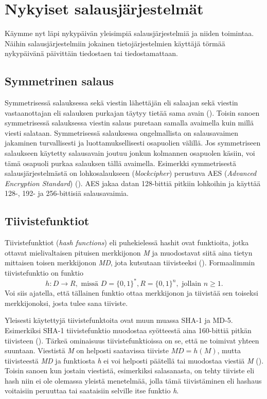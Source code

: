 \chapter{Nykyiset salausjärjestelmät\label{methods}}

Käymme nyt läpi nykypäivän yleisimpiä salausjärjestelmiä ja niiden toimintaa. Näihin salausjärjestelmiin jokainen tietojärjestelmien käyttäjä törmää nykypäivänä päivittäin tiedostaen tai tiedostamattaan.

\section{Symmetrinen salaus}
 Symmetrisessä salauksessa sekä viestin lähettäjän eli salaajan sekä viestin vastaanottajan eli salauksen purkajan täytyy tietää sama avain (\cite{bellare2005introduction}). Toisin sanoen symmetrisessä salauksessa viestin salaus puretaan samalla avaimella kuin millä viesti salataan.  Symmetrisessä salauksessa ongelmallista on salausavaimen jakaminen turvallisesti ja luottamuksellisesti osapuolien välillä. Jos symmetriseen salaukseen käytetty salausavain joutuu jonkun kolmannen osapuolen käsiin, voi tämä osapuoli purkaa salauksen tällä avaimella. Esimerkki symmetrisestä salausjärjestelmästä on lohkosalaukseen (\emph{blockcipher}) perustuva AES (\emph{Advanced Encryption Standard}) (\cite{117146}). AES jakaa datan 128-bittiä pitkiin lohkoihin ja käyttää 128-, 192- ja 256-bittisiä salausavaimia.
 
 \section{Tiivistefunktiot}
 Tiivistefunktiot (\emph{hash functions}) eli puhekielessä hashit  ovat funktioita, jotka ottavat mielivaltaisen pituisen merkkijonon \emph{M} ja muodostavat siitä aina tietyn mittaisen toisen merkkijonon \emph{MD}, jota kutsutaan tiivisteeksi (\cite{sobti2012cryptographic}). Formaalimmin tiivistefunktio on funktio
 \[h: D \to R, \text{ missä } D = \big\{0,1\big\}^{*}, R = \big\{0,1\big\}^{n}, \text{ jollain } n \geq 1.\] Voi siis ajatella, että tällainen funktio ottaa merkkijonon ja tiivistää sen toiseksi merkkijonoksi, josta tulee sana tiiviste.
 
 Yleisesti käytettyjä tiivistefunktoita ovat muun muassa SHA-1 ja MD-5. Esimerkiksi \mbox{SHA-1} tiivistefunktio muodostaa syötteestä aina 160-bittiä pitkän tiivisteen (\cite{bellare2005introduction}). Tärkeä ominaisuus tiivistefunktioissa on se, että ne toimivat yhteen suuntaan. Viestistä \emph{M} on helposti saatavissa tiiviste $MD = h(M)$, mutta tiivisteestä \emph{MD} ja funktiosta \emph{h} ei voi helposti päätellä tai muodostaa viestiä \emph{M} (\cite{bakhtiari1995cryptographic}). Toisin sanoen kun jostain viestistä, esimerkiksi salasanasta, on tehty tiiviste eli hash niin ei ole olemassa yleistä menetelmää, jolla tämä tiivistäminen eli hashaus voitaisiin peruuttaa tai saataisiin selville itse funktio \emph{h}.
 
